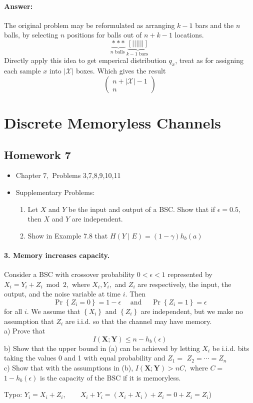 \documentclass[8pt]{article}
\begin{document}
\paragraph{Answer:}
The original problem may be reformulated as arranging $k-1$ bars and the $n$ balls, by selecting $n$ positions for balls out of $n+k-1$ locations.
$$
\underbrace{* * *}_{n \text { balls }}  \underbrace{[||||||]}_{k-1 \text { bars }}
$$
Directly apply this idea to get emperical distribution $q_x$, treat as for assigning each sample $x$ into $|\mathcal{X}|$ boxes. Which gives the result
$$\left(\begin{array}{c}n+|\mathcal{X}|-1 \\ n\end{array}\right)$$

\newpage
\section{Discrete Memoryless Channels}


\subsection{Homework 7}
\begin{itemize}
	\item Chapter $7,$ Problems 3,7,8,9,10,11
	\item Supplementary Problems:
	\begin{enumerate}
		\item Let $X$ and $Y$ be the input and output of a BSC. Show that if $\epsilon=0.5,$ then $X$ and $Y$ are independent.
		\item Show in Example 7.8 that $H(Y \mid E)=(1-\gamma) h_{b}(a)$
	\end{enumerate}
\end{itemize}

\begin{tcolorbox}
\paragraph{3. Memory increases capacity.} Consider a BSC with crossover probability $0<\epsilon<1$ represented by $X_{i}=Y_{i}+Z_{i} \bmod 2,$
where $X_{i}, Y_{i},$ and $Z_{i}$ are respectively, the input, the output, and the noise variable at time $i .$ Then
$$
\operatorname{Pr}\left\{Z_{i}=0\right\}=1-\epsilon \quad \text { and } \quad \operatorname{Pr}\left\{Z_{i}=1\right\}=\epsilon
$$
for all $i .$ We assume that $\left\{X_{i}\right\}$ and $\left\{Z_{i}\right\}$ are independent, but we make no assumption that $Z_{i}$ are i.i.d. so that the channel may have memory. \\
a) Prove that
$$
I(\mathbf{X} ; \mathbf{Y}) \leq n-h_{b}(\epsilon)
$$
b) Show that the upper bound in (a) can be achieved by letting $X_{i}$ be
i.i.d. bits taking the values 0 and 1 with equal probability and $Z_{1}=$ $Z_{2}=\cdots=Z_{n}$ \\
c) Show that with the assumptions in (b), $I(\mathbf{X} ; \mathbf{Y})>n C,$ where $C=$ $1-h_{b}(\epsilon)$ is the capacity of the $\mathrm{BSC}$ if it is memoryless.

Typo: $Y_i = X_i + Z_i, \qquad X_i+Y_i =( X_i + X_i) + Z_i = 0  + Z_i = Z_i$)
\end{tcolorbox}
\end{document}
